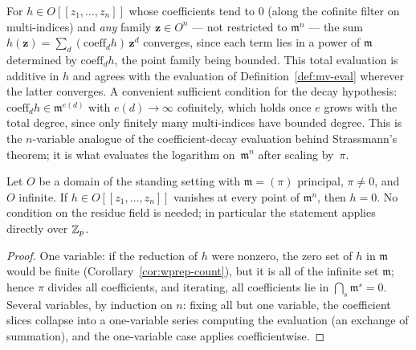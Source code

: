 \begin{definition}
\label{def:mv-evalT}
\leanok
{}
For $h \in O[[z_1,\dots,z_n]]$ whose coefficients tend to $0$ (along the cofinite filter
on multi-indices) and \emph{any} family $\mathbf z \in O^n$ --- not restricted to
$\mathfrak m^n$ --- the sum $h(\mathbf z) = \sum_d (\mathrm{coeff}_d h)\,\mathbf z^d$
converges, since each term lies in a power of $\mathfrak m$ determined by
$\mathrm{coeff}_d h$, the point family being bounded. This total evaluation is additive
in $h$ and agrees with the evaluation of Definition~\ref{def:mv-eval} wherever the
latter converges. A convenient sufficient condition for the decay hypothesis:
$\mathrm{coeff}_d h \in \mathfrak m^{e(d)}$ with $e(d) \to \infty$ cofinitely, which
holds once $e$ grows with the total degree, since only finitely many multi-indices have
bounded degree. This is the $n$-variable analogue of the coefficient-decay evaluation
behind Strassmann's theorem; it is what evaluates the logarithm on~$\mathfrak m^n$ after
scaling by~$\pi$.
\end{definition}

\begin{theorem}[Interpolation]
\label{thm:interpolation}
\leanok
{}
Let $O$ be a domain of the standing setting with $\mathfrak m = (\pi)$ principal,
$\pi \ne 0$, and $O$ infinite. If $h \in O[[z_1,\dots,z_n]]$ vanishes at every point of
$\mathfrak m^n$, then $h = 0$. No condition on the residue field is needed; in
particular the statement applies directly over $\mathbb{Z}_p$.
\end{theorem}
\begin{proof}
\leanok
One variable: if the reduction of $h$ were nonzero, the zero set of $h$ in $\mathfrak m$
would be finite (Corollary~\ref{cor:wprep-count}), but it is all of the infinite set
$\mathfrak m$; hence $\pi$ divides all coefficients, and iterating, all coefficients lie
in $\bigcap_s \mathfrak m^s = 0$. Several variables, by induction on $n$: fixing all but
one variable, the coefficient slices collapse into a one-variable series computing the
evaluation (an exchange of summation), and the one-variable case applies
coefficientwise.
\end{proof}

